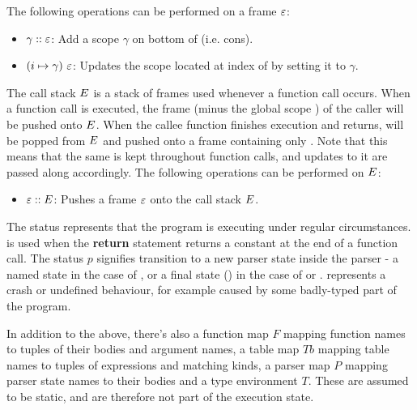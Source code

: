 \documentclass[UTF8]{article}
\begin{document}
The following operations can be performed on a frame $\varepsilon$:
\begin{itemize}
\item $ \gamma :: \varepsilon$: Add a scope $\gamma$ on bottom of \currsf{} (i.e. cons).
\item $(i \mapsto  \gamma) \,\, \varepsilon$: Updates the scope located at index \num{} of \currsf{} by setting it to $\gamma$.
\end{itemize}

The call stack $E$ is a stack of frames used whenever a function call occurs. When a function call is executed, the frame \currsf{} (minus the global scope \gscope{}) of the caller will be pushed onto $E$. When the callee function finishes execution and returns, \currsf{} will be popped from $E$ and pushed onto a frame containing only \gscope{}. Note that this means that the same \gscope{} is kept throughout function calls, and updates to it are passed along accordingly. The following operations can be performed on $E$: 
\begin{itemize}
\item $ \varepsilon :: E$: Pushes a frame $\varepsilon$ onto the call stack $E$.
\end{itemize}

The status \running{} represents that the program is executing under regular circumstances.  is used when the \textbf{return} statement returns a constant \cval{} at the end of a function call. The status $p$ signifies transition to a new parser state inside the parser - a named state in the case of \trans{\vn{}}, or a final state (\pfin{}) in the case of \accept{} or \reject{}. \sterr{} represents a crash or undefined behaviour, for example caused by some badly-typed part of the program. 

In addition to the above, there's also a function map $F$ mapping function names to tuples of their bodies and argument names, a table map $\mathit{Tb}$ mapping table names to tuples of expressions and matching kinds, a parser map $P$ mapping parser state names to their bodies and a type environment $T$. These are assumed to be static, and are therefore not part of the execution state.




\newpage
\end{document}
